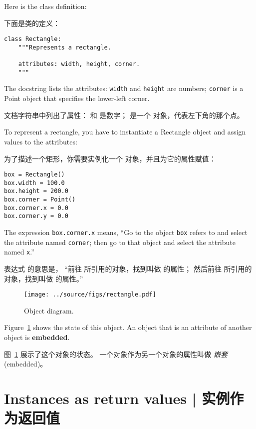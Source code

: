 Here is the class definition:

下面是类的定义：

\begin{lstlisting}
class Rectangle:
    """Represents a rectangle.

    attributes: width, height, corner.
    """
\end{lstlisting}
%
The docstring lists the attributes:  {\tt width} and
{\tt height} are numbers; {\tt corner} is a Point object that
specifies the lower-left corner.

文档字符串中列出了属性：  和  是数字；
 是一个  对象，代表左下角的那个点。

To represent a rectangle, you have to instantiate a Rectangle
object and assign values to the attributes:

为了描述一个矩形，你需要实例化一个  对象，并且为它的属性赋值：

\begin{lstlisting}
box = Rectangle()
box.width = 100.0
box.height = 200.0
box.corner = Point()
box.corner.x = 0.0
box.corner.y = 0.0
\end{lstlisting}
%
The expression {\tt box.corner.x} means,
``Go to the object {\tt box} refers to and select the attribute named
{\tt corner}; then go to that object and select the attribute named
{\tt x}.''

表达式  的意思是，
``前往  所引用的对象，找到叫做  的属性；
然后前往  所引用的对象，找到叫做  的属性。''

\begin{figure}
\centerline
{\texttt{[image: ../source/figs/rectangle.pdf]}}
\caption{Object diagram.}
\label{fig.rectangle}
\end{figure}

Figure~\ref{fig.rectangle} shows the state of this object.
An object that is an attribute of another object is {\bf embedded}.

图~\ref{fig.rectangle} 展示了这个对象的状态。
一个对象作为另一个对象的属性叫做 {\em 嵌套} (embedded)。
  
  
  


\section{Instances as return values  |  实例作为返回值}
  

